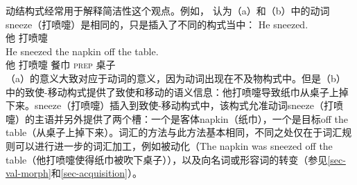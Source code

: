     动结构式经常用于解释简洁性这个观点。例如， \citet[\S~7]{Goldberg95a}认为（a）和（b）中的动词sneeze（打喷嚏）是相同的，只是插入了不同的构式当中：
\eal
\ex 
\gll He sneezed.\\
他 打喷嚏\\
\ex 
\gll He sneezed the napkin off the table.\\
他 打喷嚏  餐巾 \textsc{prep}  桌子 \\
\zl
（a）的意义大致对应于动词的意义，因为动词出现在不及物构式中。但是（b）中的致使-移动构式提供了致使和移动的语义信息：他打喷嚏导致纸巾从桌子上掉下来。sneeze（打喷嚏）插入到致使-移动构式中，该构式允准动词sneeze（打喷嚏）的主语并另外提供了两个槽：一个是客体napkin（纸巾），一个是目标off the table（从桌子上掉下来）。词汇的方法与此方法基本相同，不同之处仅在于词汇规则可以进行进一步的词汇加工，例如被动化（The napkin was sneezed off the table（他打喷嚏使得纸巾被吹下桌子）），以及向名词或形容词的转变（参见\ref{sec-val-morph}和\ref{sec-acquisition}）。   

